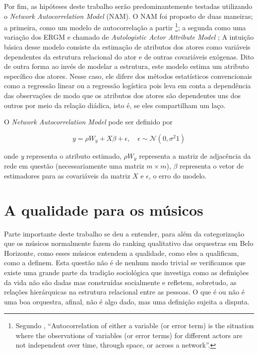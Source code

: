 \documentclass[a4paper, 12pt, openright, oneside, german, french, english, brazil]{abntex2}
\begin{document}
	Por fim, as hipóteses deste trabalho serão predominantemente testadas utilizando o \textit{Network Autocorrelation Model} (NAM). O NAM foi proposto de duas maneiras; a primeira, como um modelo de autocorrelação a partir \footnote{Segundo , ``Autocorrelation of either a variable (or error term) is the situation where the observations of variables (or error terms) for different actors are not independent over time, through space, or across a network''.}; a segunda como uma variação dos ERGM e chamado de \textit{Autologistic Actor Attribute Model} \cite{kashima2013acquisition,daraganova2013autologistic,daraganova_pattison_2013};
	A intuição básica desse modelo consiste da estimação de atributos dos atores como variáveis dependentes da estrutura relacional do ator e de outras covariáveis exógenas. Dito de outra forma ao invés de modelar a estrutura, este modelo estima um atributo específico dos atores. Nesse caso, ele difere dos métodos estatísticos convencionais como a regressão linear ou a regressão logística pois leva em conta a dependência das observações de modo que os atributos dos atores são dependentes uns dos outros por meio da relação diádica, isto é, se eles compartilham um laço.
	
	O \textit{Network Autocorrelation Model} pode ser definido por
	
	\begin{equation}\label{NAM}
	y = \rho W_y + X \beta + \epsilon, \quad \epsilon \sim \mathcal{N}(0, \sigma^2 1)
	\end{equation}
	
	onde \textit{y} representa o atributo estimado, $\rho W_y$ representa a matriz de adjacência da rede em questão (necessariamente uma matriz $m \times m$), $\beta$ representa o vetor de estimadores para as covariáveis da matriz $X$ e $\epsilon$, o erro do modelo.




	\chapter{A qualidade para os músicos}
	
	Parte importante deste trabalho se deu a entender, para além da categorização que os músicos normalmente fazem do ranking qualitativo das orquestras em Belo Horizonte, como esses músicos entendem a qualidade, como eles a qualificam, como a definem. Esta questão não é de nenhum modo trivial se verificamos que existe uma grande parte da tradição sociológica que investiga como as definições da vida não são dadas mas construídas socialmente e refletem, sobretudo, as relações hierárquicas na estrutura relacional entre as pessoas. O que é ou não é uma boa orquestra, afinal, não é algo dado, mas uma definição sujeita a disputa. 
	
\end{document}
